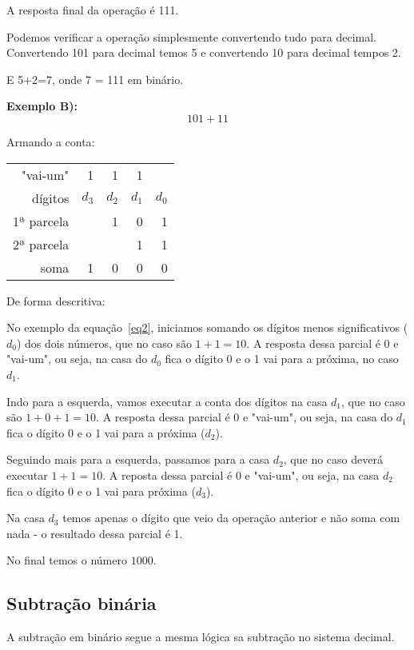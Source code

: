 A resposta final da operação é 111.

Podemos verificar a operação simplesmente convertendo tudo para decimal. Convertendo 101 para decimal temos 5 e convertendo 10 para decimal tempos 2. 

E 5+2=7, onde 7 = 111 em binário.


\textbf{Exemplo B):}
\begin{equation}\label{eq2}
101 + 11
\end{equation}

Armando a conta:
\begin{table}[h]
	\centering
	\begin{tabular}{r|rrrr}
		"vai-um"	&  	1	&  	1	& 1		& 		\\
		dígitos		& $d_3$	& $d_2$ & $d_1$ & $d_0$ \\
		1ª parcela  &  		&   1 	& 0 	& 1 \\
		2ª parcela  &  		&   	& 1 	& 1 \\
		\hline
		soma	  	&  	1	&   0 	& 0 	& 0 \\
	\end{tabular}
\end{table}

De forma descritiva:

No exemplo da equação~\ref{eq2}, iniciamos somando os dígitos menos significativos ($d_0$) dos dois números, que no caso são $ 1 + 1 = 10$. A resposta dessa parcial é 0 e "vai-um", ou seja, na casa do $d_0$ fica o dígito 0 e o 1 vai para a próxima, no caso $d_1$. 

Indo para a esquerda, vamos executar a conta dos dígitos na casa $d_1$, que no caso são $1 + 0 + 1 = 10$. A resposta dessa parcial é 0 e "vai-um", ou seja, na casa do $d_1$ fica o dígito 0 e o 1 vai para a próxima ($d_2$).

Seguindo mais para a esquerda, passamos para a casa $d_2$, que no caso deverá executar $1 + 1 = 10$. A reposta dessa parcial é 0 e "vai-um", ou seja, na casa $d_2$ fica o dígito 0 e o 1 vai para próxima ($d_3$).

Na casa $d_3$ temos apenas o dígito que veio da operação anterior e não soma com nada - o resultado dessa parcial é 1.

No final temos o número $1000$.


\subsection{Subtração binária}

A subtração em binário segue a mesma lógica sa subtração no sistema decimal. 

